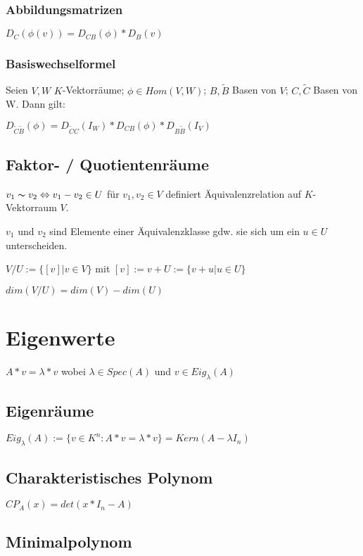 \subsubsection*{Abbildungsmatrizen}

$D_C(\phi(v)) = D_{CB}(\phi) * D_B(v)$

\subsubsection*{Basiswechselformel}

Seien $V, W$ $K$-Vektorräume; $\phi \in Hom(V, W)$; $B, \tilde B$ Basen von $V$; $C, \tilde C$ Basen von W. Dann gilt:

$D_{\tilde C \tilde B}(\phi) = D_{\tilde C C}(I_W) * D_{CB}(\phi) * D_{B\tilde B}(I_V)$

\subsection*{Faktor- / Quotientenräume}

$v_1 \thicksim v_2 \Leftrightarrow v_1 - v_2 \in U$ für $v_1, v_2 \in V$ definiert Äquivalenzrelation auf $K$-Vektorraum $V$.

$v_1$ und $v_2$ sind Elemente einer Äquivalenzklasse gdw. sie sich um ein $u \in U$ unterscheiden.

$V/U := \{[v] | v \in V\}$ mit $[v] := v+U := \{v+u|u \in U\}$

$dim(V/U) = dim(V) - dim(U)$

\section*{Eigenwerte}

$A*v = \lambda * v$ wobei $\lambda \in Spec(A)$ und $v \in Eig_\lambda(A)$

\subsection*{Eigenräume}

$Eig_\lambda(A) := \{v \in K^n : A*v = \lambda * v\} = Kern(A-\lambda I_n)$

\subsection*{Charakteristisches Polynom}

$CP_A(x) = det(x*I_n - A)$

\subsection*{Minimalpolynom}

